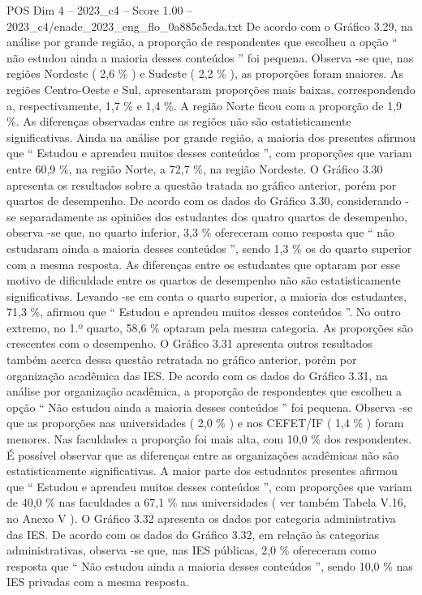 \begin{textsample}{POS Dim 4 – 2023\_c4 – Score 1.00 – 2023\_c4/enade\_2023\_eng\_flo\_0a885c5cda.txt}
De acordo com o Gráfico 3.29, na análise por grande região, a proporção de respondentes que escolheu a opção “ não estudou ainda a maioria desses conteúdos ” foi pequena.
Observa -se que, nas regiões Nordeste ( 2,6 \% ) e Sudeste ( 2,2 \% ), as proporções foram maiores.
As regiões Centro-Oeste e Sul, apresentaram proporções mais baixas, correspondendo a, respectivamente, 1,7 \% e 1,4 \%.
A região Norte ficou com a proporção de 1,9 \%.
As diferenças observadas entre as regiões não são estatisticamente significativas.
Ainda na análise por grande região, a maioria dos presentes afirmou que “ Estudou e aprendeu muitos desses conteúdos ”, com proporções que variam entre 60,9 \%, na região Norte, a 72,7 \%, na região Nordeste.
O Gráfico 3.30 apresenta os resultados sobre a questão tratada no gráfico anterior, porém por quartos de desempenho.
De acordo com os dados do Gráfico 3.30, considerando -se separadamente as opiniões dos estudantes dos quatro quartos de desempenho, observa -se que, no quarto inferior, 3,3 \% ofereceram como resposta que “ não estudaram ainda a maioria desses conteúdos ”, sendo 1,3 \% os do quarto superior com a mesma resposta.
As diferenças entre os estudantes que optaram por esse motivo de dificuldade entre os quartos de desempenho não são estatisticamente significativas.
Levando -se em conta o quarto superior, a maioria dos estudantes, 71,3 \%, afirmou que “ Estudou e aprendeu muitos desses conteúdos ”.
No outro extremo, no 1.º quarto, 58,6 \% optaram pela mesma categoria.
As proporções são crescentes com o desempenho.
O Gráfico 3.31 apresenta outros resultados também acerca dessa questão retratada no gráfico anterior, porém por organização acadêmica das IES.
De acordo com os dados do Gráfico 3.31, na análise por organização acadêmica, a proporção de respondentes que escolheu a opção “ Não estudou ainda a maioria desses conteúdos ” foi pequena.
Observa -se que as proporções nas universidades ( 2,0 \% ) e nos CEFET/IF ( 1,4 \% ) foram menores.
Nas faculdades a proporção foi mais alta, com 10,0 \% dos respondentes.
É possível observar que as diferenças entre as organizações acadêmicas não são estatisticamente significativas.
A maior parte dos estudantes presentes afirmou que “ Estudou e aprendeu muitos desses conteúdos ”, com proporções que variam de 40,0 \% nas faculdades a 67,1 \% nas universidades ( ver também Tabela V.16, no Anexo V ).
O Gráfico 3.32 apresenta os dados por categoria administrativa das IES.
De acordo com os dados do Gráfico 3.32, em relação às categorias administrativas, observa -se que, nas IES públicas, 2,0 \% ofereceram como resposta que “ Não estudou ainda a maioria desses conteúdos ”, sendo 10,0 \% nas IES privadas com a mesma resposta.

\end{textsample}
